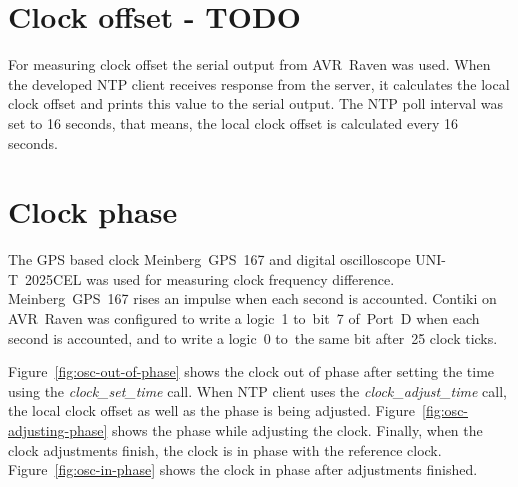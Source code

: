 \section{Clock offset - TODO}
For measuring clock offset the serial output from AVR~Raven was used.
When the developed NTP client receives response from the server,
it calculates the local clock offset and prints this value to the serial output.
The NTP poll interval was set to 16 seconds, that means, the local clock offset
is calculated every 16 seconds.

\section{Clock phase}
The GPS based clock Meinberg~GPS~167 and digital oscilloscope UNI-T~2025CEL
was used for measuring clock frequency difference.
Meinberg~GPS~167 rises an impulse when each second is accounted.
Contiki on AVR~Raven was configured to write a logic~1
to~bit~7 of~Port~D when each second is accounted,
and to write a logic~0 to~the same bit after~25 clock ticks.

Figure~\ref{fig:osc-out-of-phase} shows the clock out of phase
after setting the time using the {\it{clock\_set\_time}} call.
When NTP client uses the {\it{clock\_adjust\_time}} call,
the local clock offset as well as the phase is being adjusted.
Figure~\ref{fig:osc-adjusting-phase} shows the phase while adjusting the clock.
Finally, when the clock adjustments finish, the clock is in phase with
the reference clock. Figure~\ref{fig:osc-in-phase} shows the clock in phase after adjustments finished.
